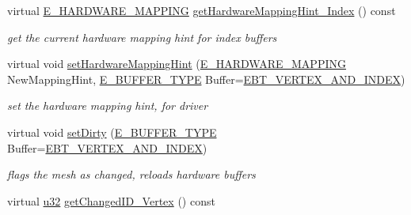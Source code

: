 \begin{DoxyCompactItemize}
virtual \hyperlink{namespaceirr_1_1scene_ac7d8ee8d77da75f2580bb9bb17231c27}{E\+\_\+\+H\+A\+R\+D\+W\+A\+R\+E\+\_\+\+M\+A\+P\+P\+I\+NG} \hyperlink{structirr_1_1scene_1_1SSkinMeshBuffer_a3f1c1c7652af10b2de87ae24ff2989ff}{get\+Hardware\+Mapping\+Hint\+\_\+\+Index} () const
\begin{DoxyCompactList}\small\item\em get the current hardware mapping hint for index buffers \end{DoxyCompactList}\item 
\mbox{\label{structirr_1_1scene_1_1SSkinMeshBuffer_abee3db2badc118f0024a75eb86bc823b}} 
virtual void \hyperlink{structirr_1_1scene_1_1SSkinMeshBuffer_abee3db2badc118f0024a75eb86bc823b}{set\+Hardware\+Mapping\+Hint} (\hyperlink{namespaceirr_1_1scene_ac7d8ee8d77da75f2580bb9bb17231c27}{E\+\_\+\+H\+A\+R\+D\+W\+A\+R\+E\+\_\+\+M\+A\+P\+P\+I\+NG} New\+Mapping\+Hint, \hyperlink{namespaceirr_1_1scene_a8f59a89ffef0ad8e5b2c2cb874a93e8c}{E\+\_\+\+B\+U\+F\+F\+E\+R\+\_\+\+T\+Y\+PE} Buffer=\hyperlink{namespaceirr_1_1scene_a8f59a89ffef0ad8e5b2c2cb874a93e8ca34ea664123fbc28610408e51b014dcdd}{E\+B\+T\+\_\+\+V\+E\+R\+T\+E\+X\+\_\+\+A\+N\+D\+\_\+\+I\+N\+D\+EX})
\begin{DoxyCompactList}\small\item\em set the hardware mapping hint, for driver \end{DoxyCompactList}\item 
\mbox{\label{structirr_1_1scene_1_1SSkinMeshBuffer_ae4c0ce6333329191929e2023c9727a3a}} 
virtual void \hyperlink{structirr_1_1scene_1_1SSkinMeshBuffer_ae4c0ce6333329191929e2023c9727a3a}{set\+Dirty} (\hyperlink{namespaceirr_1_1scene_a8f59a89ffef0ad8e5b2c2cb874a93e8c}{E\+\_\+\+B\+U\+F\+F\+E\+R\+\_\+\+T\+Y\+PE} Buffer=\hyperlink{namespaceirr_1_1scene_a8f59a89ffef0ad8e5b2c2cb874a93e8ca34ea664123fbc28610408e51b014dcdd}{E\+B\+T\+\_\+\+V\+E\+R\+T\+E\+X\+\_\+\+A\+N\+D\+\_\+\+I\+N\+D\+EX})
\begin{DoxyCompactList}\small\item\em flags the mesh as changed, reloads hardware buffers \end{DoxyCompactList}\item 
virtual \hyperlink{namespaceirr_a0416a53257075833e7002efd0a18e804}{u32} \hyperlink{structirr_1_1scene_1_1SSkinMeshBuffer_a94faa430425d73fbb6cab74ac65af1c1}{get\+Changed\+I\+D\+\_\+\+Vertex} () const

\end{DoxyCompactItemize}
